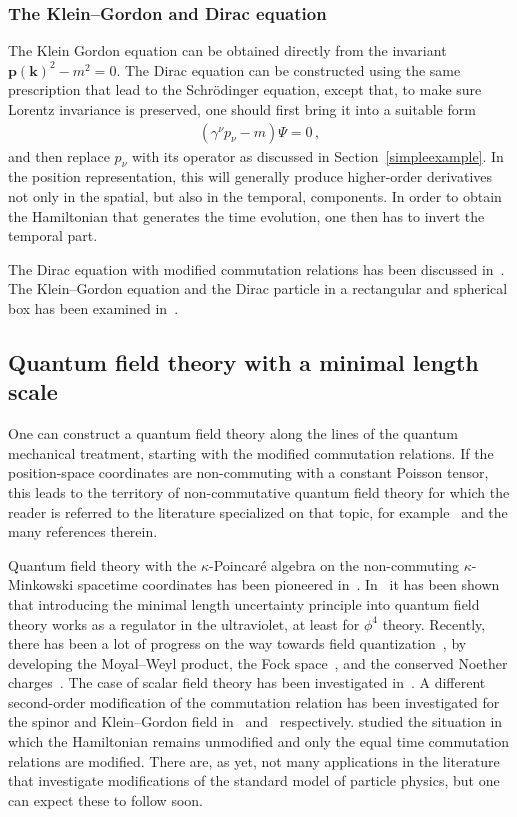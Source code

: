 \documentclass{article}
\def\beqn{\begin{eqnarray}}
\def\eeqn{\end{eqnarray}}
\begin{document}
\subsubsection{The Klein--Gordon and Dirac equation}

The Klein Gordon equation can be obtained directly from the invariant $\mathbf{p}(\mathbf{k})^2 - m^2 =0$. 
The Dirac equation can be constructed using the same prescription that lead to the Schr{\"o}dinger equation,
except that, to make sure Lorentz invariance is preserved, one should first bring it into a suitable form
\beqn
( \gamma^\nu p_\nu - m) \Psi = 0 \,,  
\eeqn
and then replace $p_\nu$ with its operator as discussed in Section~\ref{simpleexample}. In the position representation, this will generally 
produce higher-order derivatives not only in the spatial, but also in the temporal, components. In
order to obtain the Hamiltonian that generates the time evolution, one then has to invert the temporal part.

The Dirac equation with modified commutation relations has been discussed in~\cite{Hossenfelder:2003jz,Kober:2010sj}. The Klein--Gordon equation and the Dirac particle in a rectangular and spherical box 
has been examined in~\cite{Das:2010zf}.

\subsection{Quantum field theory with a minimal length scale}
\label{qftml}

One can construct a quantum field theory along the lines of the quantum mechanical treatment, starting 
with the modified commutation relations. If the
position-space coordinates are non-commuting with a constant Poisson tensor, this leads to the territory of non-commutative
quantum field theory for which the reader is referred to the literature specialized on that
topic, for example~\cite{Douglas:2001ba,Hinchliffe:2002km} and the many references therein. 

Quantum field theory with the $\kappa$-Poincar\'e algebra on the non-commuting $\kappa$-Minkowski
spacetime coordinates has been pioneered in~\cite{Kempf:1994qp,Kempf:1996ss,Kempf:1996nk}. In~\cite{Kempf:1996mv}
it has been shown that introducing the minimal length uncertainty principle into quantum field theory works as a regulator in the
ultraviolet, at least for $\phi^4$ theory. Recently, there has 
been a lot of progress on the way towards field quantization~\cite{Arzano:2010jw}, by developing the Moyal--Weyl product, the
Fock space~\cite{Camacho:2003dm,Arzano:2007ef}, and the conserved Noether charges~\cite{Freidel:2007hk,Agostini:2006nc,Arzano:2007gr}.
The case of scalar field theory has been investigated in~\cite{Arzano:2009ci,Meljanac:2010ps}. A different
second-order modification of the commutation relation has been investigated for the spinor and
Klein--Gordon field in~\cite{Moayedi:2011ur} and~\cite{Moayedi:2010vp} respectively. \cite{Carmona:2009ra} studied the situation in which the Hamiltonian remains
unmodified and only the equal time commutation relations are modified.
There are,
as yet, not many applications in the literature that investigate modifications of the standard model of
particle physics, but one can expect these to follow soon.
\end{document}
